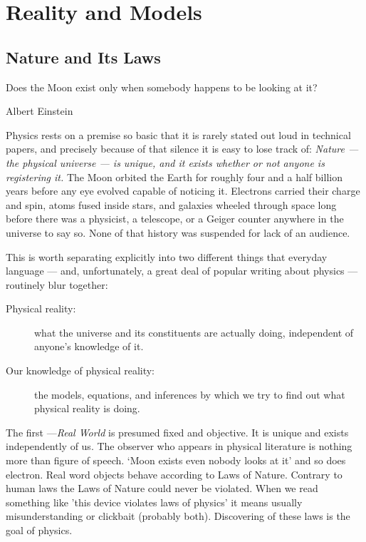 \chapter{Reality and Models}
\label{ch:rm}

\section{Nature and Its Laws}
\label{sec:rm-nl}
\epigraph{Does the Moon exist only when somebody happens to be looking at it?}
{Albert Einstein}

Physics rests on a premise so basic that it is rarely stated out loud in
technical papers, and precisely because of that silence it is easy to lose
track of: \emph{Nature --- the physical universe --- is unique, and it
exists whether or not anyone is registering it.} The Moon orbited the Earth
for roughly four and a half billion years before any eye evolved capable of
noticing it. Electrons carried their charge and spin, atoms fused inside
stars, and galaxies wheeled through space long before there was a physicist,
a telescope, or a Geiger counter anywhere in the universe to say so. None of
that history was suspended for lack of an audience.

This is worth separating explicitly into two different things that everyday
language --- and, unfortunately, a great deal of popular writing about
physics --- routinely blur together:
\begin{description}
    \item [Physical reality:] what the universe and its constituents
  are actually doing, independent of anyone's knowledge of it.
    \item [ Our knowledge of physical reality:] the models, equations,
   and inferences by which we try to find out what physical
  reality is doing.
\end{description}

The first ---\emph{Real World} is presumed fixed and objective. It is unique
and exists independently of us. The observer who appears in physical literature
is nothing more than figure of speech. `Moon exists even nobody looks at it'
and so does electron. Real word objects behave according to Laws of Nature.
Contrary to human laws the Laws of Nature could never be violated. When we read
something like 'this device violates laws of physics' it means usually
misunderstanding or clickbait (probably both). Discovering of these laws is the
goal of physics. 

